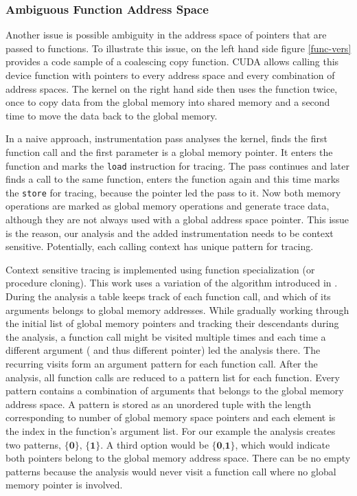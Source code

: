 \subsubsection{Ambiguous Function Address Space}\label{func-vers-sec}
Another issue is possible ambiguity in the address space of pointers that are passed to functions. To illustrate this issue, on the left hand side figure \ref{func-vers} provides  a code sample of a coalescing copy function. CUDA allows calling this device function with pointers to every address space and every combination of address spaces. The kernel on the right hand side then uses the function twice, once to copy data from the global memory into shared memory and a second time to move the data back to the global memory.

In a naive approach, instrumentation pass analyses the kernel, finds the first function call and the first
parameter is a global memory pointer. It enters the function and marks the \verb|load| instruction for tracing. The pass continues and later finds a call to the same function, enters the function again and this time marks the \verb|store| for tracing, because the pointer
led the pass to it. Now both memory operations are marked as global memory operations and generate trace data, although they are not always used with a global address space pointer. This issue is the reason, our analysis and the added
instrumentation needs to be context sensitive. Potentially, each calling context has unique pattern for tracing.

Context sensitive tracing is implemented using function specialization (or procedure cloning). This work uses a variation of the algorithm introduced in \cite{Cooper:1993:MPC:2245763.2246020}. During the analysis a table keeps track of each function call, and which of
its arguments belongs to global memory addresses. While gradually working through the initial list of  global memory pointers and tracking their descendants during the analysis, a function call might be visited multiple times and each time a different argument ( and thus different pointer) led the analysis there. The recurring visits form an argument pattern for each function call. After the analysis, all function calls are reduced
to a pattern list for each function. Every pattern contains a combination of arguments that belongs to the global memory address space. A pattern is stored as an unordered tuple with the length corresponding
to number of global memory space pointers and each element is the index in the function's argument list. 
For our example the analysis creates two patterns, $\textbf{\{0\}, \{1\}}$. A third option would be 
 $\textbf{\{0,1\}}$, which would indicate both pointers belong to the global memory address space.
There can be no empty patterns because the analysis would never visit a function call where no global memory pointer is involved.

